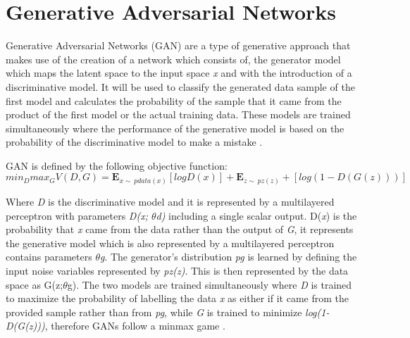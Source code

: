 \section{Generative Adversarial Networks}

Generative Adversarial Networks  (GAN) are a type of generative approach that makes use of the creation of a network which consists of, the generator model which maps the latent space to the input space \textit{x} and with the introduction of a discriminative model. It will be used to classify the generated data sample of the first model and calculates the probability of the sample that it came from the product of the first model or the actual training data. These models  are trained simultaneously where the performance of the generative model is based on the probability of the discriminative model to make a mistake \citep{goodfellow:2014}. 

GAN is defined by the following objective function:
\begin{equation}\label{minmax}
min_{D}max_{G} V(D,G)= \mathbf{E}_{x \sim\ pdata(x)}[log D(x)] + \mathbf{E}_{z\sim\ pz(z)} + [log(1 - D(G(z)))]
\end{equation}

Where \textit{D} is the discriminative model and it is represented by a multilayered perceptron with parameters \textit{D(x; $\theta$d)} including a single scalar output. D(\textit{x}) is the probability that \textit{x}  came from the data rather than the output of \textit{G}, it represents the generative model which is also represented by a multilayered perceptron contains parameters $\theta$\textit{g}. The generator's distribution \textit{pg} is learned by defining the input noise variables represented by \textit{pz(z)}. This is then represented by the data space as G(z;$\theta$g). The two models are trained simultaneously where \textit{D} is trained to maximize the probability of labelling the data \textit{x} as either if it came from the provided sample rather than from \textit{pg}, while \textit{G} is trained to minimize \textit{log(1-D(G(z)))}, therefore GANs follow a minmax game \citep{goodfellow:2014}.

